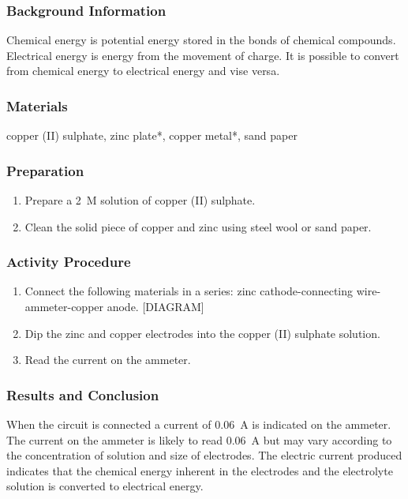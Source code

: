 \subsubsection*{Background Information}
Chemical energy is potential energy stored in the bonds of chemical compounds. Electrical energy is energy from the movement of charge. It is possible to convert from chemical energy to electrical energy and vise versa.

\subsubsection*{Materials}
copper (II) sulphate, zinc plate*, copper metal*, sand paper

\subsubsection*{Preparation}
\begin{enumerate}
\item{Prepare a 2~M solution of copper (II) sulphate.}
\item{Clean the solid piece of copper and zinc using steel wool or sand paper.}
\end{enumerate}

\subsubsection*{Activity Procedure}
\begin{enumerate}
\item{Connect the following materials in a series: zinc cathode-connecting wire-ammeter-copper anode. [DIAGRAM]}
\item{Dip the zinc and copper electrodes into the copper (II) sulphate solution.}
\item{Read the current on the ammeter.}
\end{enumerate}

\subsubsection*{Results and Conclusion}
When the circuit is connected a current of 0.06~A is indicated on the ammeter. The current on the ammeter is likely to read 0.06~A but may vary according to the concentration of solution and size of electrodes. The electric current produced indicates that the chemical energy inherent in the electrodes and the electrolyte solution is converted to electrical energy.

